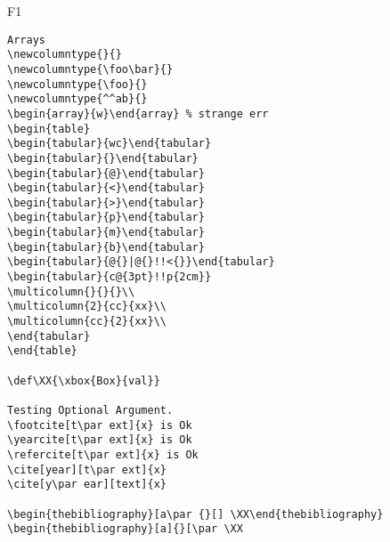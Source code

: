 \documentclass{article}
\begin{document}
\begin{filecontents+}{F1}
\begin{Verbatim}
Arrays
\newcolumntype{}{}
\newcolumntype{\foo\bar}{}
\newcolumntype{\foo}{}
\newcolumntype{^^ab}{}
\begin{array}{w}\end{array} % strange err
\begin{table}
\begin{tabular}{wc}\end{tabular}
\begin{tabular}{}\end{tabular}
\begin{tabular}{@}\end{tabular}
\begin{tabular}{<}\end{tabular}
\begin{tabular}{>}\end{tabular}
\begin{tabular}{p}\end{tabular}
\begin{tabular}{m}\end{tabular}
\begin{tabular}{b}\end{tabular}
\begin{tabular}{@{}|@{}!!<{}}\end{tabular}
\begin{tabular}{c@{3pt}!!p{2cm}}
\multicolumn{}{}{}\\
\multicolumn{2}{cc}{xx}\\
\multicolumn{cc}{2}{xx}\\
\end{tabular}
\end{table}

\def\XX{\xbox{Box}{val}}

Testing Optional Argument. 
\footcite[t\par ext]{x} is Ok
\yearcite[t\par ext]{x} is Ok
\refercite[t\par ext]{x} is Ok
\cite[year][t\par ext]{x}
\cite[y\par ear][text]{x}

\begin{thebibliography}[a\par {}[] \XX\end{thebibliography}
\begin{thebibliography}[a]{}[\par \XX


\end{Verbatim}
\end{filecontents+}
\end{document}
